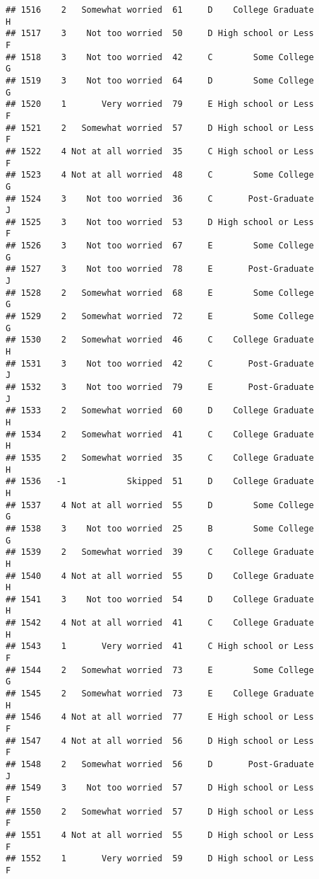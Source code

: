 \documentclass[
]{article}
\begin{document}
\begin{verbatim}
## 1516    2   Somewhat worried  61     D    College Graduate         H
## 1517    3    Not too worried  50     D High school or Less         F
## 1518    3    Not too worried  42     C        Some College         G
## 1519    3    Not too worried  64     D        Some College         G
## 1520    1       Very worried  79     E High school or Less         F
## 1521    2   Somewhat worried  57     D High school or Less         F
## 1522    4 Not at all worried  35     C High school or Less         F
## 1523    4 Not at all worried  48     C        Some College         G
## 1524    3    Not too worried  36     C       Post-Graduate         J
## 1525    3    Not too worried  53     D High school or Less         F
## 1526    3    Not too worried  67     E        Some College         G
## 1527    3    Not too worried  78     E       Post-Graduate         J
## 1528    2   Somewhat worried  68     E        Some College         G
## 1529    2   Somewhat worried  72     E        Some College         G
## 1530    2   Somewhat worried  46     C    College Graduate         H
## 1531    3    Not too worried  42     C       Post-Graduate         J
## 1532    3    Not too worried  79     E       Post-Graduate         J
## 1533    2   Somewhat worried  60     D    College Graduate         H
## 1534    2   Somewhat worried  41     C    College Graduate         H
## 1535    2   Somewhat worried  35     C    College Graduate         H
## 1536   -1            Skipped  51     D    College Graduate         H
## 1537    4 Not at all worried  55     D        Some College         G
## 1538    3    Not too worried  25     B        Some College         G
## 1539    2   Somewhat worried  39     C    College Graduate         H
## 1540    4 Not at all worried  55     D    College Graduate         H
## 1541    3    Not too worried  54     D    College Graduate         H
## 1542    4 Not at all worried  41     C    College Graduate         H
## 1543    1       Very worried  41     C High school or Less         F
## 1544    2   Somewhat worried  73     E        Some College         G
## 1545    2   Somewhat worried  73     E    College Graduate         H
## 1546    4 Not at all worried  77     E High school or Less         F
## 1547    4 Not at all worried  56     D High school or Less         F
## 1548    2   Somewhat worried  56     D       Post-Graduate         J
## 1549    3    Not too worried  57     D High school or Less         F
## 1550    2   Somewhat worried  57     D High school or Less         F
## 1551    4 Not at all worried  55     D High school or Less         F
## 1552    1       Very worried  59     D High school or Less         F

\end{verbatim}
\end{document}
